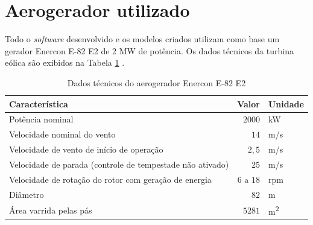 \documentclass{article}
\begin{document}
	\section{Aerogerador utilizado}
	Todo o \emph{software} desenvolvido e os modelos criados utilizam como base um gerador Enercon E-82 E2 de 2 MW de potência.
	Os dados técnicos da turbina eólica são exibidos na Tabela \ref{tab:dados-tecnicos} \cite{enercon:e82}.
	\begin{table}[ht]
		\centering
		\begin{tabular}{l|r|l}
			\textbf{Característica} & \textbf{Valor} & \textbf{Unidade}\\ \hline
			Potência nominal & $2000$ & kW\\ \hline
			Velocidade nominal do vento & $14$ & m/s \\ \hline
			Velocidade de vento de início de operação & $2,5$ & m/s \\ \hline
			Velocidade de parada (controle de tempestade não ativado) & $25$ & m/s \\ \hline
			Velocidade de rotação do rotor com geração de energia & $6 \text{~a~} 18$ & rpm \\ \hline
			Diâmetro & $82$ & m \\ \hline
			Área varrida pelas pás & $5281$ & m\textsuperscript{2} \\ \hline
		\end{tabular}
		\caption{Dados técnicos do aerogerador Enercon E-82 E2}
		\label{tab:dados-tecnicos}
	\end{table}
	\clearpage
	
	
	
\end{document}
